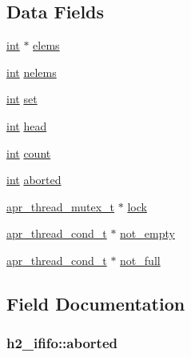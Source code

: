 \subsection*{Data Fields}
\begin{DoxyCompactItemize}
\item 
\hyperlink{pcre_8txt_a42dfa4ff673c82d8efe7144098fbc198}{int} $\ast$ \hyperlink{structh2__ififo_ab57dc11eb31dffb2386086b0eeae41dc}{elems}
\item 
\hyperlink{pcre_8txt_a42dfa4ff673c82d8efe7144098fbc198}{int} \hyperlink{structh2__ififo_a89e10335008993b88d6b6155aa390249}{nelems}
\item 
\hyperlink{pcre_8txt_a42dfa4ff673c82d8efe7144098fbc198}{int} \hyperlink{structh2__ififo_a15eddfaf468031ddf3393777a2356fc1}{set}
\item 
\hyperlink{pcre_8txt_a42dfa4ff673c82d8efe7144098fbc198}{int} \hyperlink{structh2__ififo_a14a000e2f5d8579481eade8c3cb675fc}{head}
\item 
\hyperlink{pcre_8txt_a42dfa4ff673c82d8efe7144098fbc198}{int} \hyperlink{structh2__ififo_ad551f9f408b672be6e5a8be089655bea}{count}
\item 
\hyperlink{pcre_8txt_a42dfa4ff673c82d8efe7144098fbc198}{int} \hyperlink{structh2__ififo_a6f1f68d3bcee57d1c8dab0e586584843}{aborted}
\item 
\hyperlink{structapr__thread__mutex__t}{apr\+\_\+thread\+\_\+mutex\+\_\+t} $\ast$ \hyperlink{structh2__ififo_ab1bbd9b16fedc59f26b605db5812c1c3}{lock}
\item 
\hyperlink{structapr__thread__cond__t}{apr\+\_\+thread\+\_\+cond\+\_\+t} $\ast$ \hyperlink{structh2__ififo_a650c1d0a16f1d9372174c9defcc69e22}{not\+\_\+empty}
\item 
\hyperlink{structapr__thread__cond__t}{apr\+\_\+thread\+\_\+cond\+\_\+t} $\ast$ \hyperlink{structh2__ififo_ab78e5e0f828a1ec7d0a26729812c9031}{not\+\_\+full}
\end{DoxyCompactItemize}


\subsection{Field Documentation}
\subsubsection[{\texorpdfstring{aborted}{aborted}}]{ h2\+\_\+ififo\+::aborted}\hypertarget{structh2__ififo_a6f1f68d3bcee57d1c8dab0e586584843}{}\label{structh2__ififo_a6f1f68d3bcee57d1c8dab0e586584843}
